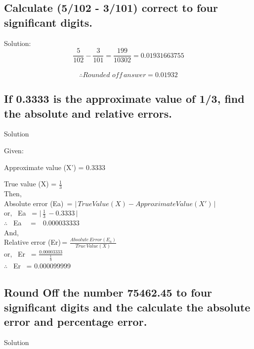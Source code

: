 \documentclass[12pt]{article}
\begin{document}
\subsection{Calculate (5/102 - 3/101) correct to four significant digits.}
\bigskip
Solution:\\
$$\frac{5}{102} - \frac{3}{101} = \frac{199}{10302} = 0.01931663755$$\\
$$\therefore Rounded \,\, off \, answer = 0.01932$$
\pagebreak
\subsection{If 0.3333 is the approximate value of 1/3, find the absolute and relative errors.}
\bigskip
Solution

Given:

Approximate value (X') = 0.3333 

True value (X) = $\frac{1}{3}$ \\
Then, \\

Absolute error (Ea) \hspace{0.2in}\,=\,\,$ \vert \, True Value(X) - Approximate Value (X') \, \vert $\\

or, \, Ea \hspace{1in} \, =\,\,$ \vert \,  \frac{1}{3}  \,- 0.3333\, \vert$ \\

$\therefore$ \, Ea \hspace{1in} \,\,\,\, = \,\, 0.000033333\\
And,\\

Relative error (Er)\hspace{0.2 in}\,=\,\,$\frac{{Absolute \, Error (E_a)}}{{True  \, Value(X)}}$ \\

or, \, Er \hspace{0.9in} \, =\,\,$ \frac{0.00003333}{\frac{1}{3}}$\\

$\therefore$ \, Er \hspace{0.95in} \, =\,\,0.000099999\\
\subsection{Round Off the number 75462.45 to four significant digits and the calculate the absolute error and percentage error.}
Solution 
\end{document}
